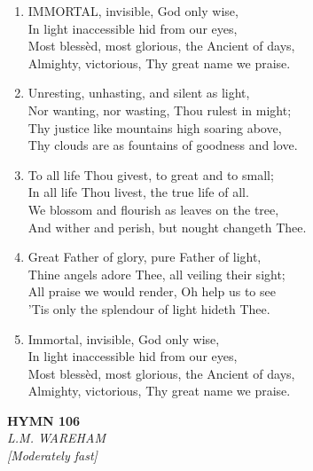 \begin{enumerate}
    \item IMMORTAL, invisible, God only wise, \\
        In light inaccessible hid from our eyes, \\
        Most bless\`ed, most glorious, the Ancient of days, \\
        Almighty, victorious, Thy great name we praise.

    \item Unresting, unhasting, and silent as light, \\
        Nor wanting, nor wasting, Thou rulest in might; \\
        Thy justice like mountains high soaring above, \\
        Thy clouds are as fountains of goodness and love.

    \item To all life Thou givest, to great and to small; \\
        In all life Thou livest, the true life of all. \\
        We blossom and flourish as leaves on the tree, \\
        And wither and perish, but nought changeth Thee.

    \item Great Father of glory, pure Father of light, \\
        Thine angels adore Thee, all veiling their sight; \\
        All praise we would render, Oh help us to see \\
        'Tis only the splendour of light hideth Thee.

    \item Immortal, invisible, God only wise, \\
        In light inaccessible hid from our eyes, \\
        Most bless\`ed, most glorious, the Ancient of days, \\
        Almighty, victorious, Thy great name we praise.

\end{enumerate}

\newpage
\begin{center}
    {\Large \textbf{HYMN 106}}
    \\
    \textit{L.M. WAREHAM}
    \\
    \textit{\small [Moderately fast]}
\end{center}
\vspace{1em}

